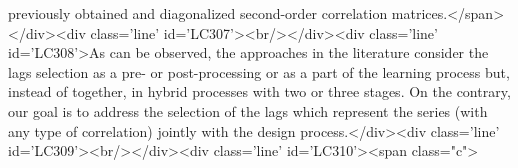 previously obtained and diagonalized second-order correlation matrices.</span></div><div class='line' id='LC307'><br/></div><div class='line' id='LC308'>As can be observed, the approaches in the literature consider the lags selection as a pre- or post-processing or as a part of the learning process but, instead of together, in hybrid processes with two or three stages. On the contrary, our goal is to address the selection of the lags which represent the series (with any type of correlation) jointly with the design process.</div><div class='line' id='LC309'><br/></div><div class='line' id='LC310'><span class="c">%